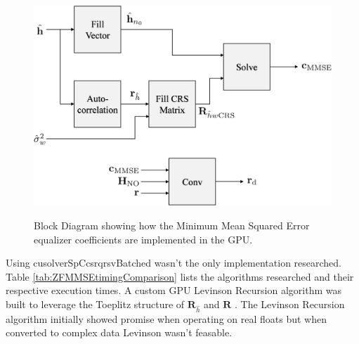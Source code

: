 \begin{figure}
	\centering\includegraphics[width=7.98in/100*55]{figures/eq_GPUimplementation/blockMMSE.pdf}
	\label{fig:blockMMSE}
	\caption{Block Diagram showing how the Minimum Mean Squared Error equalizer coefficients are implemented in the GPU.}
\end{figure}

Using cusolverSpCcsrqrsvBatched wasn't the only implementation researched.
Table \ref{tab:ZFMMSEtimingComparison} lists the algorithms researched and their respective execution times.
A custom GPU Levinson Recursion algorithm was built to leverage the Toeplitz structure of $\mathbf{R}_{\hat{h}}$ and $\mathbf{R}$ \cite[Chap. 5]{hayes:1996}. 
The Levinson Recursion algorithm initially showed promise when operating on real floats but when converted to complex data Levinson wasn't feasable.


